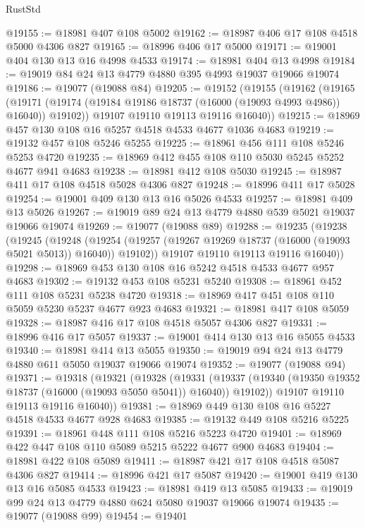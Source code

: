 \begin{lexlean}{RustStd}
\begin{coremodule}
@19155 := @18981 @407 @108 @5002
@19162 := @18987 @406 @17 @108 @4518 @5000 @4306 @827
@19165 := @18996 @406 @17 @5000
@19171 := @19001 @404 @130 @13 @16 @4998 @4533
@19174 := @18981 @404 @13 @4998
@19184 := @19019 @84 @24 @13 @4779 @4880 @395 @4993 @19037 @19066 @19074
@19186 := @19077 (@19088 @84)
@19205 := @19152
    (@19155
      (@19162
        (@19165
          (@19171 (@19174 (@19184 @19186 @18737 (@16000 (@19093 @4993 @4986)) @16040)) @19102))
        @19107
        @19110
        @19113
        @19116
        @16040))
@19215 := @18969 @457 @130 @108 @16 @5257 @4518 @4533 @4677 @1036 @4683
@19219 := @19132 @457 @108 @5246 @5255
@19225 := @18961 @456 @111 @108 @5246 @5253 @4720
@19235 := @18969 @412 @455 @108 @110 @5030 @5245 @5252 @4677 @941 @4683
@19238 := @18981 @412 @108 @5030
@19245 := @18987 @411 @17 @108 @4518 @5028 @4306 @827
@19248 := @18996 @411 @17 @5028
@19254 := @19001 @409 @130 @13 @16 @5026 @4533
@19257 := @18981 @409 @13 @5026
@19267 := @19019 @89 @24 @13 @4779 @4880 @539 @5021 @19037 @19066 @19074
@19269 := @19077 (@19088 @89)
@19288 := @19235
    (@19238
      (@19245
        (@19248
          (@19254 (@19257 (@19267 @19269 @18737 (@16000 (@19093 @5021 @5013)) @16040)) @19102))
        @19107
        @19110
        @19113
        @19116
        @16040))
@19298 := @18969 @453 @130 @108 @16 @5242 @4518 @4533 @4677 @957 @4683
@19302 := @19132 @453 @108 @5231 @5240
@19308 := @18961 @452 @111 @108 @5231 @5238 @4720
@19318 := @18969 @417 @451 @108 @110 @5059 @5230 @5237 @4677 @923 @4683
@19321 := @18981 @417 @108 @5059
@19328 := @18987 @416 @17 @108 @4518 @5057 @4306 @827
@19331 := @18996 @416 @17 @5057
@19337 := @19001 @414 @130 @13 @16 @5055 @4533
@19340 := @18981 @414 @13 @5055
@19350 := @19019 @94 @24 @13 @4779 @4880 @611 @5050 @19037 @19066 @19074
@19352 := @19077 (@19088 @94)
@19371 := @19318
    (@19321
      (@19328
        (@19331
          (@19337 (@19340 (@19350 @19352 @18737 (@16000 (@19093 @5050 @5041)) @16040)) @19102))
        @19107
        @19110
        @19113
        @19116
        @16040))
@19381 := @18969 @449 @130 @108 @16 @5227 @4518 @4533 @4677 @928 @4683
@19385 := @19132 @449 @108 @5216 @5225
@19391 := @18961 @448 @111 @108 @5216 @5223 @4720
@19401 := @18969 @422 @447 @108 @110 @5089 @5215 @5222 @4677 @900 @4683
@19404 := @18981 @422 @108 @5089
@19411 := @18987 @421 @17 @108 @4518 @5087 @4306 @827
@19414 := @18996 @421 @17 @5087
@19420 := @19001 @419 @130 @13 @16 @5085 @4533
@19423 := @18981 @419 @13 @5085
@19433 := @19019 @99 @24 @13 @4779 @4880 @624 @5080 @19037 @19066 @19074
@19435 := @19077 (@19088 @99)
@19454 := @19401

\end{coremodule}
\end{lexlean}
